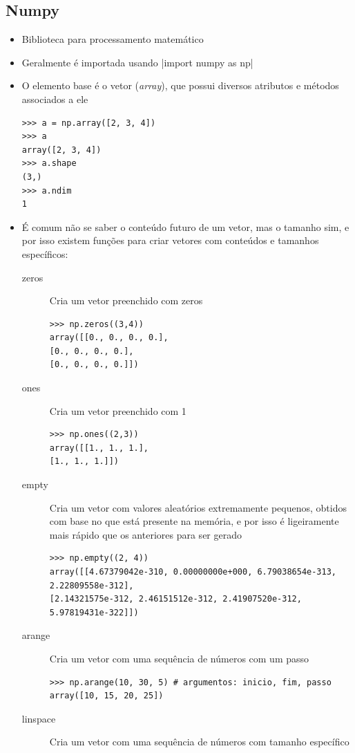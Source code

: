 \subsection{Numpy}
\begin{itemize}
	\item Biblioteca para processamento matemático
	\item Geralmente é importada usando |import numpy as np|
	\item O elemento base é o vetor (\textit{array}), que possui diversos atributos e métodos associados a ele
	\begin{verbatim}
>>> a = np.array([2, 3, 4])
>>> a
array([2, 3, 4])
>>> a.shape
(3,)
>>> a.ndim
1
	\end{verbatim}
	\item É comum não se saber o conteúdo futuro de um vetor, mas o tamanho sim, e por isso existem funções para criar vetores com conteúdos e tamanhos específicos:
	\begin{description}
		\item[zeros] Cria um vetor preenchido com zeros
		\begin{verbatim}
>>> np.zeros((3,4))
array([[0., 0., 0., 0.],
[0., 0., 0., 0.],
[0., 0., 0., 0.]])
		\end{verbatim}
		\item[ones] Cria um vetor preenchido com 1
		\begin{verbatim}
>>> np.ones((2,3))
array([[1., 1., 1.],
[1., 1., 1.]])
		\end{verbatim}
		\item[empty] Cria um vetor com valores aleatórios extremamente pequenos, obtidos com base no que está presente na memória, e por isso é ligeiramente mais rápido que os anteriores para ser gerado
		\begin{verbatim}
>>> np.empty((2, 4))
array([[4.67379042e-310, 0.00000000e+000, 6.79038654e-313,
2.22809558e-312],
[2.14321575e-312, 2.46151512e-312, 2.41907520e-312,
5.97819431e-322]])
		\end{verbatim}
		\item[arange] Cria um vetor com uma sequência de números com um passo
		\begin{verbatim}
>>> np.arange(10, 30, 5) # argumentos: inicio, fim, passo
array([10, 15, 20, 25])
		\end{verbatim}
		\item[linspace] Cria um vetor com uma sequência de números com tamanho específico
		\begin{verbatim}

\end{verbatim}
\end{description}
\end{itemize}
